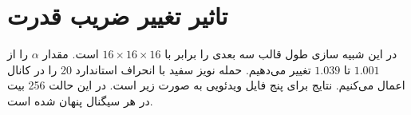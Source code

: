 \section{تاثیر تغییر ضریب قدرت }
در این شبیه سازی طول قالب سه بعدی را برابر با $16 \times 16 \times 16$ است. مقدار $\alpha $ را از $1.001$ تا $1.039$ تغییر می‌دهیم. حمله  نویز سفید با انحراف استاندارد 20 را در کانال اعمال می‌کنیم. نتایج برای پنج فایل ویدئویی به صورت زیر است. در این حالت 256 بیت در هر سیگنال پنهان شده است. 











